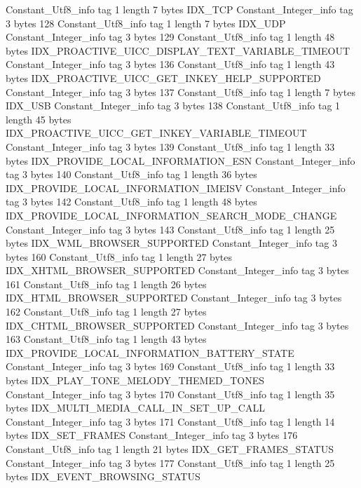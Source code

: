 {{{		}
		Constant_Utf8_info {
			tag	1
			length	7
			bytes	IDX_TCP
		}
		Constant_Integer_info {
			tag	3
			bytes	128
		}
		Constant_Utf8_info {
			tag	1
			length	7
			bytes	IDX_UDP
		}
		Constant_Integer_info {
			tag	3
			bytes	129
		}
		Constant_Utf8_info {
			tag	1
			length	48
			bytes	IDX_PROACTIVE_UICC_DISPLAY_TEXT_VARIABLE_TIMEOUT
		}
		Constant_Integer_info {
			tag	3
			bytes	136
		}
		Constant_Utf8_info {
			tag	1
			length	43
			bytes	IDX_PROACTIVE_UICC_GET_INKEY_HELP_SUPPORTED
		}
		Constant_Integer_info {
			tag	3
			bytes	137
		}
		Constant_Utf8_info {
			tag	1
			length	7
			bytes	IDX_USB
		}
		Constant_Integer_info {
			tag	3
			bytes	138
		}
		Constant_Utf8_info {
			tag	1
			length	45
			bytes	IDX_PROACTIVE_UICC_GET_INKEY_VARIABLE_TIMEOUT
		}
		Constant_Integer_info {
			tag	3
			bytes	139
		}
		Constant_Utf8_info {
			tag	1
			length	33
			bytes	IDX_PROVIDE_LOCAL_INFORMATION_ESN
		}
		Constant_Integer_info {
			tag	3
			bytes	140
		}
		Constant_Utf8_info {
			tag	1
			length	36
			bytes	IDX_PROVIDE_LOCAL_INFORMATION_IMEISV
		}
		Constant_Integer_info {
			tag	3
			bytes	142
		}
		Constant_Utf8_info {
			tag	1
			length	48
			bytes	IDX_PROVIDE_LOCAL_INFORMATION_SEARCH_MODE_CHANGE
		}
		Constant_Integer_info {
			tag	3
			bytes	143
		}
		Constant_Utf8_info {
			tag	1
			length	25
			bytes	IDX_WML_BROWSER_SUPPORTED
		}
		Constant_Integer_info {
			tag	3
			bytes	160
		}
		Constant_Utf8_info {
			tag	1
			length	27
			bytes	IDX_XHTML_BROWSER_SUPPORTED
		}
		Constant_Integer_info {
			tag	3
			bytes	161
		}
		Constant_Utf8_info {
			tag	1
			length	26
			bytes	IDX_HTML_BROWSER_SUPPORTED
		}
		Constant_Integer_info {
			tag	3
			bytes	162
		}
		Constant_Utf8_info {
			tag	1
			length	27
			bytes	IDX_CHTML_BROWSER_SUPPORTED
		}
		Constant_Integer_info {
			tag	3
			bytes	163
		}
		Constant_Utf8_info {
			tag	1
			length	43
			bytes	IDX_PROVIDE_LOCAL_INFORMATION_BATTERY_STATE
		}
		Constant_Integer_info {
			tag	3
			bytes	169
		}
		Constant_Utf8_info {
			tag	1
			length	33
			bytes	IDX_PLAY_TONE_MELODY_THEMED_TONES
		}
		Constant_Integer_info {
			tag	3
			bytes	170
		}
		Constant_Utf8_info {
			tag	1
			length	35
			bytes	IDX_MULTI_MEDIA_CALL_IN_SET_UP_CALL
		}
		Constant_Integer_info {
			tag	3
			bytes	171
		}
		Constant_Utf8_info {
			tag	1
			length	14
			bytes	IDX_SET_FRAMES
		}
		Constant_Integer_info {
			tag	3
			bytes	176
		}
		Constant_Utf8_info {
			tag	1
			length	21
			bytes	IDX_GET_FRAMES_STATUS
		}
		Constant_Integer_info {
			tag	3
			bytes	177
		}
		Constant_Utf8_info {
			tag	1
			length	25
			bytes	IDX_EVENT_BROWSING_STATUS
}}}
